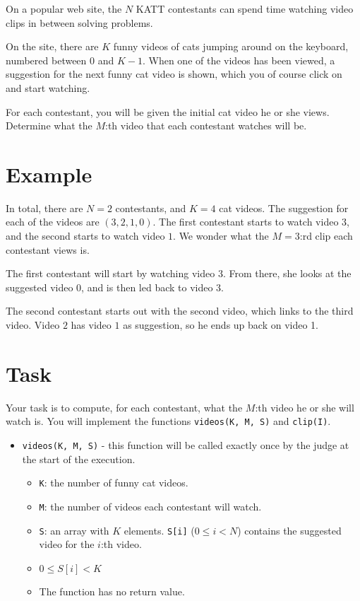 \newcommand\version{v2}
On a popular web site, the $N$ KATT contestants can spend time watching video clips in between solving problems.

On the site, there are $K$ funny videos of cats jumping around on the keyboard, numbered between $0$ and $K - 1$.
When one of the videos has been viewed, a suggestion for the next funny cat video is shown, which you of course click on and start watching.

For each contestant, you will be given the initial cat video he or she views. Determine what the $M$:th video
that each contestant watches will be.

\section*{Example}
In total, there are $N = 2$ contestants, and $K = 4$ cat videos.
The suggestion for each of the videos are $(3, 2, 1, 0)$. The first contestant starts to watch video $3$, and the second starts to watch video $1$.
We wonder what the $M = 3$:rd clip each contestant views is.

The first contestant will start by watching video 3. From there, she looks at the suggested video 0, and is then led back to video 3.

The second contestant starts out with the second video, which links to the third video. Video $2$ has video $1$ as suggestion, so he ends up back on video 1.

\section*{Task}
Your task is to compute, for each contestant, what the $M$:th video he or she will watch is.
You will implement the functions \texttt{videos(K, M, S)} and \texttt{clip(I)}.

\begin{itemize}
  \item \texttt{videos(K, M, S)} - this function will be called exactly once by the judge at the start of the execution.
  \begin{itemize}
    \item \texttt{K}: the number of funny cat videos.
    \item \texttt{M}: the number of videos each contestant will watch.
    \item \texttt{S}: an array with $K$ elements. \texttt{S[i]} ($0 \le i < N$) contains the suggested video for the $i$:th video.
		\item $0 \le S[i] < K$
		\item The function has no return value.
  \end{itemize}
\end{itemize}

